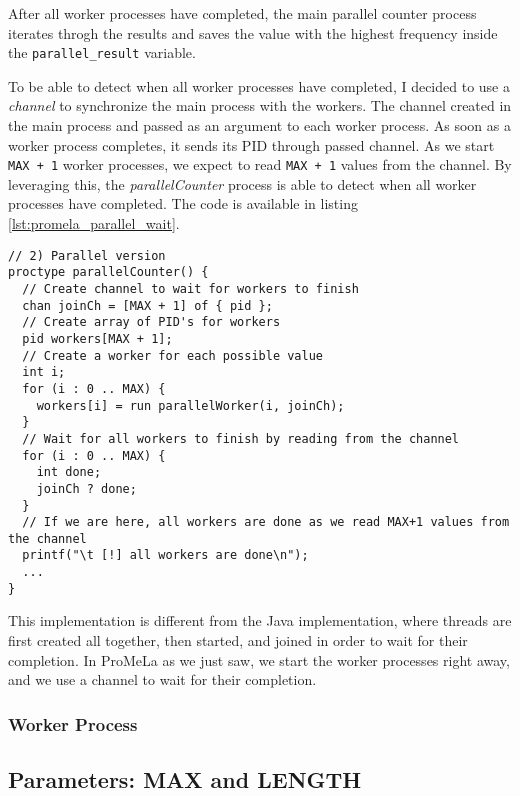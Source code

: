\documentclass[a4paper, 11pt]{article}
\begin{document}
After all worker processes have completed, the main parallel counter process iterates throgh the results and saves the value with the highest frequency inside the \texttt{parallel\_result} variable.

To be able to detect when all worker processes have completed, I decided to use a \textit{channel} to synchronize the main process with the workers. The channel created in the main process and passed as an argument to each worker process. As soon as a worker process completes, it sends its PID through passed channel. As we start \texttt{MAX + 1} worker processes, we expect to read \texttt{MAX + 1} values from the channel. By leveraging this, the \textit{parallelCounter} process is able to detect when all worker processes have completed. The code is available in listing \ref{lst:promela_parallel_wait}.

\begin{lstlisting}[language=Promela, caption={ProMeLa parallel frequency counter - worker synchronization with channel}, captionpos=b, breaklines=true, label={lst:promela_parallel_wait}]
// 2) Parallel version
proctype parallelCounter() {
  // Create channel to wait for workers to finish
  chan joinCh = [MAX + 1] of { pid };
  // Create array of PID's for workers
  pid workers[MAX + 1];
  // Create a worker for each possible value
  int i;
  for (i : 0 .. MAX) {
    workers[i] = run parallelWorker(i, joinCh);
  }
  // Wait for all workers to finish by reading from the channel
  for (i : 0 .. MAX) {
    int done;
    joinCh ? done;
  }
  // If we are here, all workers are done as we read MAX+1 values from the channel
  printf("\t [!] all workers are done\n");
  ...
}
\end{lstlisting}

This implementation is different from the Java implementation, where threads are first created all together, then started, and joined in order to wait for their completion. In ProMeLa as we just saw, we start the worker processes right away, and we use a channel to wait for their completion.

\subsubsection{Worker Process}

\subsection{Parameters: MAX and LENGTH}
\end{document}

